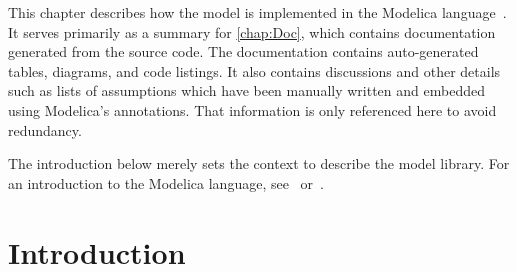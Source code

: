 
\glsresetall
{}

\DeclareDocumentCommand{}

\DeclareDocumentCommand{}%

\setlength\fboxsep{0pt}
\setlength\fboxrule{0.5pt}

 

This chapter describes how the model is implemented in the Modelica language~\cite{Modelica3.3}.  It serves primarily as a summary for \autoref{chap:Doc}, which contains documentation generated from the source code.  The documentation contains auto-generated tables, diagrams, and code listings.  It also contains discussions and other details such as lists of assumptions which have been manually written and embedded using Modelica's annotations.  That information is only referenced here to avoid redundancy.

The introduction below merely sets the context to describe the model library.  For an introduction to the Modelica language, see~\cite{Tiller2002} or~\cite{ModelicaTutorial1.4}.


\section{Introduction}

